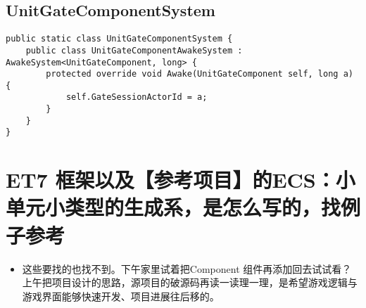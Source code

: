 \documentclass[9pt, b5paper]{article}
\begin{document}
\subsection{UnitGateComponentSystem}
\label{sec-8-2}
\begin{verbatim}
public static class UnitGateComponentSystem {
    public class UnitGateComponentAwakeSystem : AwakeSystem<UnitGateComponent, long> {
        protected override void Awake(UnitGateComponent self, long a) {
            self.GateSessionActorId = a;
        }
    }
}
\end{verbatim}

\section{ET7 框架以及【参考项目】的ECS：小单元小类型的生成系，是怎么写的，找例子参考}
\label{sec-9}
\begin{itemize}
\item 这些要找的也找不到。下午家里试着把Component 组件再添加回去试试看？上午把项目设计的思路，源项目的破源码再读一读理一理，是希望游戏逻辑与游戏界面能够快速开发、项目进展往后移的。
\end{itemize}
\end{document}
